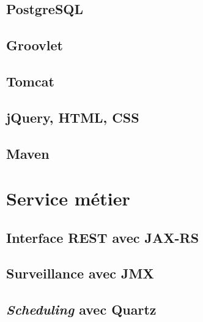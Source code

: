 \documentclass{article}
\begin{document}
\subsection{PostgreSQL} %
\label{sub:postgresql}

\subsection{Groovlet} %
\label{sub:groovlet}

\subsection{Tomcat} %
\label{sub:tomcat}

\subsection{jQuery, HTML, CSS} %
\label{sub:jquery}

\subsection{Maven} %
\label{sub:maven}


\section{Service métier} %
\label{sec:service_metier}

\subsection{Interface REST avec JAX-RS} %
\label{sub:interface_rest}

\subsection{Surveillance avec JMX} %
\label{sub:surveillance_jmx}

\subsection{\emph{Scheduling} avec Quartz} %
\label{sub:scheduling_avec_quartz}
\end{document}
